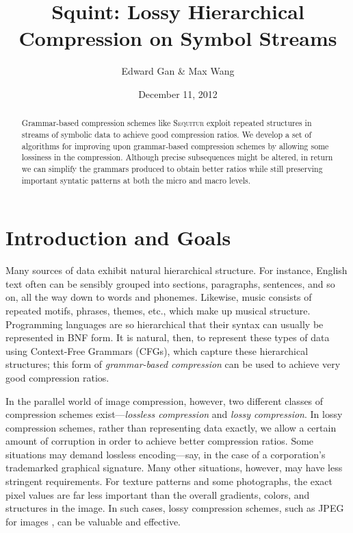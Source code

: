 \documentclass[11pt]{article}
\newcommand{\Sequitur}{\textsc{Sequitur}\xspace}
\begin{document}


\title{%
  \vspace{-.2in}%
  Squint: Lossy Hierarchical Compression on Symbol Streams%
  \vspace{-.1in}%
}
\author{Edward Gan \& Max Wang}
\date{%
  \vspace{-.1in}%
  December 11, 2012%
}

\maketitle

\begin{abstract}

Grammar-based compression schemes like \Sequitur exploit repeated structures in
streams of symbolic data to achieve good compression ratios.  We develop a set
of algorithms for improving upon grammar-based compression schemes by allowing
some lossiness in the compression.  Although precise subsequences might be
altered, in return we can simplify the grammars produced to obtain better
ratios while still preserving important syntatic patterns at both the micro and
macro levels.

\end{abstract}

\tableofcontents

\section{Introduction and Goals}

Many sources of data exhibit natural hierarchical structure.  For instance,
English text often can be sensibly grouped into sections, paragraphs,
sentences, and so on, all the way down to words and phonemes.  Likewise, music
consists of repeated motifs, phrases, themes, etc., which make up musical
structure.  Programming languages are so hierarchical that their syntax can
usually be represented in BNF form.  It is natural, then, to represent these
types of data using Context-Free Grammars (CFGs), which capture these
hierarchical structures; this form of \emph{grammar-based compression} can be
used to achieve very good compression ratios.

In the parallel world of image compression, however, two different classes of
compression schemes exist---\emph{lossless compression} and \emph{lossy
compression}.  In lossy compression schemes, rather than representing data
exactly, we allow a certain amount of corruption in order to achieve better
compression ratios.  Some situations may demand lossless encoding---say, in the
case of a corporation's trademarked graphical signature.  Many other
situations, however, may have less stringent requirements.  For texture
patterns and some photographs, the exact pixel values are far less important
than the overall gradients, colors, and structures in the image.  In such
cases, lossy compression schemes, such as JPEG for images \cite{jpeg}, can be
valuable and effective.
\end{document}
